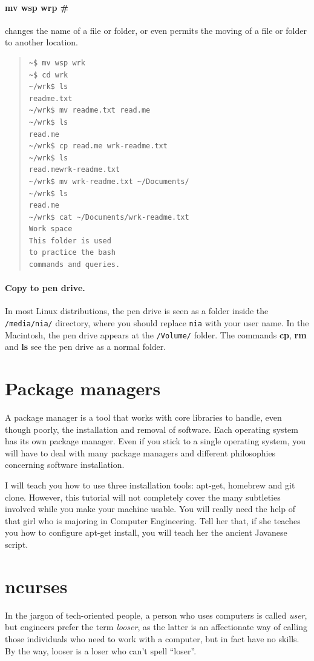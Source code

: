\documentclass[a4paper,12pt]{book}
\begin{document}
\paragraph{mv wsp wrp \#} changes
the name of a file or folder, or
even permits the moving of a file or
folder to another location.
\begin{quote}
\begin{verbatim}
~$ mv wsp wrk
~$ cd wrk
~/wrk$ ls
readme.txt
~/wrk$ mv readme.txt read.me
~/wrk$ ls
read.me
~/wrk$ cp read.me wrk-readme.txt
~/wrk$ ls
read.mewrk-readme.txt
~/wrk$ mv wrk-readme.txt ~/Documents/
~/wrk$ ls
read.me
~/wrk$ cat ~/Documents/wrk-readme.txt
Work space
This folder is used
to practice the bash
commands and queries.
\end{verbatim}
\end{quote}

\paragraph{Copy to pen drive.}
In most Linux distributions, the pen drive is
seen as a folder inside the \verb|/media/nia/|
directory, where you should replace \verb|nia|
with your user name. In the Macintosh, the
pen drive appears at the \verb|/Volume/| folder.
The commands {\bf cp}, {\bf rm} and {\bf ls}
see the pen drive as a normal folder.


\section{Package managers}
A package
manager is a tool that works with
core libraries to handle, even though poorly,
the installation and removal of
software. Each operating system has its own
package manager. Even if you stick to a single
operating system, you will have to
deal with many package managers
and different philosophies concerning
software installation.


I will teach you how to use three
installation tools: apt-get,
homebrew and git clone. However,
this tutorial will not
completely cover the many subtleties
involved while you make your machine usable.
You will really need the help of
that girl who is majoring in
Computer Engineering.
Tell her that, if she teaches you
how to configure apt-get install,
you will teach her the ancient
Javanese script.

\section{ncurses}
In the jargon of tech-oriented people,
a person who uses computers is called
{\em user}, but engineers
prefer the term {\em looser}, as
the latter is an affectionate way
of calling those individuals who need to work
with a computer, but in fact have no skills. By the way,
looser is a loser who can't spell ``loser''.
\end{document}
